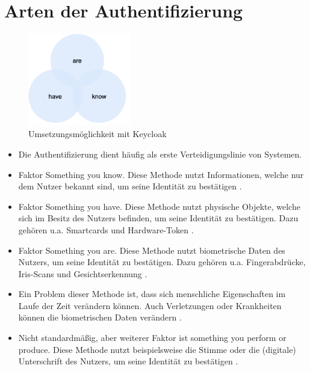 \section{Arten der Authentifizierung}

\begin{figure}[h]
	\centering 
	\includegraphics[width=0.4\textwidth]{img/abbildungen/factors.png}
	\captionsetup{format=hang}
	\caption{Umsetzungsmöglichkeit mit Keycloak}
\end{figure}

\begin{itemize}
    \item Die Authentifizierung dient häufig als erste Verteidigungslinie von Systemen. \cite{boonkrong2012security}
    \item Faktor Something you know. Diese Methode nutzt Informationen, welche nur dem Nutzer bekannt sind, um seine Identität zu bestätigen \cite{boonkrong2012security}.
    \item Faktor Something you have. Diese Methode nutzt physische Objekte, welche sich im Besitz des Nutzers befinden, um seine Identität zu bestätigen. Dazu gehören u.a. Smartcards und Hardware-Token \cite{boonkrong2012security}.
    \item Faktor Something you are. Diese Methode nutzt biometrische Daten des Nutzers, um seine Identität zu bestätigen. Dazu gehören u.a. Fingerabdrücke, Iris-Scans und Gesichtserkennung \cite{boonkrong2012security}.
    \item Ein Problem dieser Methode ist, dass sich menschliche Eigenschaften im Laufe der Zeit verändern können. Auch Verletzungen oder Krankheiten können die biometrischen Daten verändern \cite{boonkrong2012security}.
    \item Nicht standardmäßig, aber weiterer Faktor ist something you perform or produce. Diese Methode nutzt beispielsweise die Stimme oder die (digitale) Unterschrift des Nutzers, um seine Identität zu bestätigen \cite{boonkrong2012security}.
\end{itemize}


